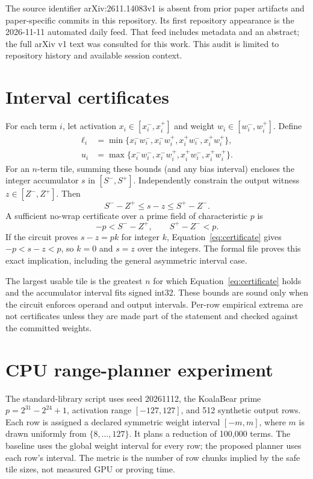 \documentclass[11pt]{article}
\begin{document}
The source identifier arXiv:2611.14083v1 is absent from prior paper artifacts and paper-specific commits in this repository. Its first repository appearance is the 2026-11-11 automated daily feed. That feed includes metadata and an abstract; the full arXiv v1 text was consulted for this work. This audit is limited to repository history and available session context.

\section{Interval certificates}
For each term $i$, let activation $x_i\in[x_i^-,x_i^+]$ and weight $w_i\in[w_i^-,w_i^+]$. Define
\begin{align*}
\ell_i &= \min\{x_i^-w_i^-,x_i^-w_i^+,x_i^+w_i^-,x_i^+w_i^+\},\\
u_i &= \max\{x_i^-w_i^-,x_i^-w_i^+,x_i^+w_i^-,x_i^+w_i^+\}.
\end{align*}
For an $n$-term tile, summing these bounds (and any bias interval) encloses the integer accumulator $s$ in $[S^-,S^+]$. Independently constrain the output witness $z\in[Z^-,Z^+]$. Then
\begin{equation}
  S^- - Z^+ \le s-z \le S^+ - Z^-.
\end{equation}
A sufficient no-wrap certificate over a prime field of characteristic $p$ is
\begin{equation}\label{eq:certificate}
  -p < S^- - Z^+, \qquad S^+ - Z^- < p.
\end{equation}
If the circuit proves $s-z=pk$ for integer $k$, Equation~\ref{eq:certificate} gives $-p<s-z<p$, so $k=0$ and $s=z$ over the integers. The formal file proves this exact implication, including the general asymmetric interval case.

The largest usable tile is the greatest $n$ for which Equation~\ref{eq:certificate} holds and the accumulator interval fits signed int32. These bounds are sound only when the circuit enforces operand and output intervals. Per-row empirical extrema are not certificates unless they are made part of the statement and checked against the committed weights.

\section{CPU range-planner experiment}
The standard-library script uses seed 20261112, the KoalaBear prime $p=2^{31}-2^{24}+1$, activation range $[-127,127]$, and 512 synthetic output rows. Each row is assigned a declared symmetric weight interval $[-m,m]$, where $m$ is drawn uniformly from $\{8,\ldots,127\}$. It plans a reduction of 100,000 terms. The baseline uses the global weight interval for every row; the proposed planner uses each row's interval. The metric is the number of row chunks implied by the safe tile sizes, not measured GPU or proving time.
\end{document}
